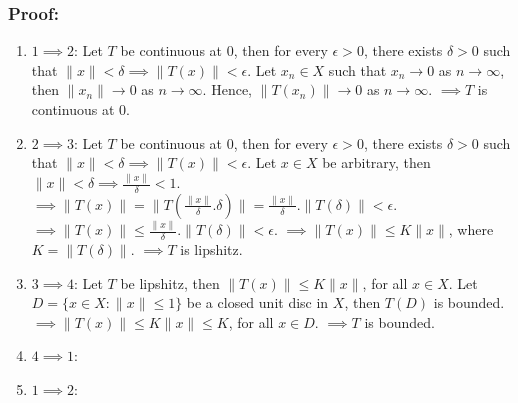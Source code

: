 \documentclass[12pt]{article}
\begin{document}
\subsubsection*{Proof:}
\begin{enumerate}
    \item $1 \implies 2$:
    \newline
    Let $T$ be continuous at $0$, then for every $\epsilon > 0$, there exists $\delta > 0$ such that $\|x\| < \delta \implies \|T(x)\| < \epsilon$.
    \newline
    Let ${x_n} \in X$ such that $x_n \to 0$ as $n \to \infty$, then $\|x_n\| \to 0$ as $n \to \infty$.
    \newline
    Hence, $\|T(x_n)\| \to 0$ as $n \to \infty$.
    \newline
    $\implies T$ is continuous at $0$.
    \item $2 \implies 3$:
    \newline
    Let $T$ be continuous at $0$, then for every $\epsilon > 0$, there exists $\delta > 0$ such that $\|x\| < \delta \implies \|T(x)\| < \epsilon$.
    \newline
    Let $x \in X$ be arbitrary, then $\|x\| < \delta \implies \frac{\|x\|}{\delta} < 1$.
    \newline
    $\implies \|T(x)\| = \|T(\frac{\|x\|}{\delta}.\delta)\| = \frac{\|x\|}{\delta}.\|T(\delta)\| < \epsilon$.
    \newline
    $\implies \|T(x)\| \leq \frac{\|x\|}{\delta}.\|T(\delta)\| < \epsilon$.
    \newline
    $\implies \|T(x)\| \leq K \|x\|$, where $K = \|T(\delta)\|$.
    \newline
    $\implies T$ is lipshitz.
    \item $3 \implies 4$:
    \newline
    Let $T$ be lipshitz, then $\|T(x)\| \leq K \|x\|$, for all $x \in X$.
    \newline
    Let $D = \{x \in X: \|x\| \leq 1\}$ be a closed unit disc in $X$, then $T(D)$ is bounded.
    \newline
    $\implies \|T(x)\| \leq K \|x\| \leq K$, for all $x \in D$.
    \newline
    $\implies T$ is bounded.
    \item $4 \implies 1$:
    \item $1 \implies 2$:
\end{enumerate}

\newpage
\end{document}
